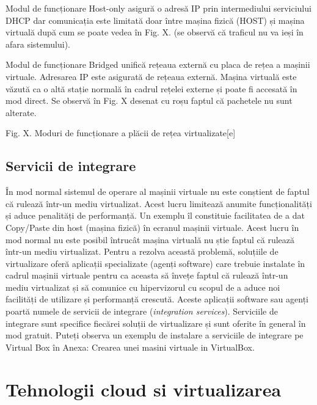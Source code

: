 Modul de funcționare Host-only asigură o adresă IP prin intermediului
serviciului DHCP dar comunicația este limitată doar între mașina fizică (HOST)
și mașina virtuală după cum se poate vedea în Fig. X. (se observă că traficul nu
va ieși în afara sistemului).

Modul de funcționare Bridged unifică rețeaua externă cu placa de rețea a mașinii
virtuale. Adresarea IP este asigurată de rețeaua externă. Mașina virtuală este
văzută ca o altă stație normală în cadrul rețelei externe și poate fi accesată
în mod direct. Se observă în Fig. X desenat cu roșu faptul că pachetele nu sunt
alterate.

Fig. X. Moduri de funcționare a plăcii de rețea virtualizate[e]

\subsection{Servicii de integrare}
\label{sec:vm-ops-services}

În mod normal sistemul de operare al mașinii virtuale nu este conștient de
faptul că rulează într-un mediu virtualizat. Acest lucru limitează anumite
funcționalități și aduce penalități de performanță. Un exemplu îl constituie
facilitatea de a dat Copy/Paste din host (mașina fizică) în ecranul mașinii
virtuale. Acest lucru în mod normal nu este posibil întrucât mașina virtuală nu
știe faptul că rulează într-un mediu virtualizat. Pentru a rezolva această
problemă, soluțiile de virtualizare oferă aplicații specializate (agenți
software) care trebuie instalate în cadrul mașinii virtuale pentru ca aceasta să
învețe faptul că rulează într-un mediu virtualizat și să comunice cu
hipervizorul cu scopul de a aduce noi facilități de utilizare și performanță
crescută. Aceste aplicații software sau agenți poartă numele de servicii de
integrare (\textit{integration services}). Serviciile de integrare sunt
specifice fiecărei soluții de virtualizare și sunt oferite în general în mod
gratuit. Puteți observa un exemplu de instalare a serviciile de integrare pe
Virtual Box în Anexa: Crearea unei masini virtuale in VirtualBox.

\section{Tehnologii cloud si virtualizarea}
\label{sec:vm-cloud}

